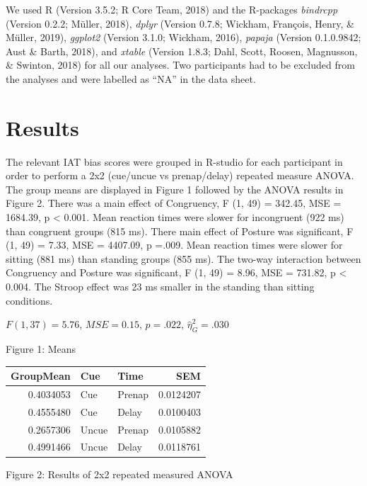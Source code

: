\documentclass[man,floatsintext]{apa6}
\begin{document}
We used R (Version 3.5.2; R Core Team, 2018) and the R-packages
\emph{bindrcpp} (Version 0.2.2; Müller, 2018), \emph{dplyr} (Version
0.7.8; Wickham, François, Henry, \& Müller, 2019), \emph{ggplot2}
(Version 3.1.0; Wickham, 2016), \emph{papaja} (Version 0.1.0.9842; Aust
\& Barth, 2018), and \emph{xtable} (Version 1.8.3; Dahl, Scott, Roosen,
Magnusson, \& Swinton, 2018) for all our analyses. Two participants had
to be excluded from the analyses and were labelled as \enquote{NA} in
the data sheet.

\section{Results}\label{results}

The relevant IAT bias scores were grouped in R-studio for each
participant in order to perform a 2x2 (cue/uncue vs prenap/delay)
repeated measure ANOVA. The group means are displayed in Figure 1
followed by the ANOVA results in Figure 2. There was a main effect of
Congruency, F (1, 49) = 342.45, MSE = 1684.39, p \textless{} 0.001. Mean
reaction times were slower for incongruent (922 ms) than congruent
groups (815 ms). There main effect of Posture was significant, F (1, 49)
= 7.33, MSE = 4407.09, p =.009. Mean reaction times were slower for
sitting (881 ms) than standing groups (855 ms). The two-way interaction
between Congruency and Posture was significant, F (1, 49) = 8.96, MSE =
731.82, p \textless{} 0.004. The Stroop effect was 23 ms smaller in the
standing than sitting conditions.

\(F(1, 37) = 5.76\), \(\mathit{MSE} = 0.15\), \(p = .022\),
\(\hat{\eta}^2_G = .030\)

Figure 1: Means

\begin{tabular}{r|l|l|r}
\hline
GroupMean & Cue & Time & SEM\\
\hline
0.4034053 & Cue & Prenap & 0.0124207\\
\hline
0.4555480 & Cue & Delay & 0.0100403\\
\hline
0.2657306 & Uncue & Prenap & 0.0105882\\
\hline
0.4991466 & Uncue & Delay & 0.0118761\\
\hline
\end{tabular}

Figure 2: Results of 2x2 repeated measured ANOVA
\end{document}
